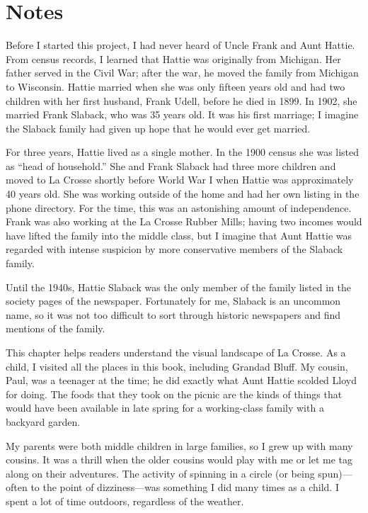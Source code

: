 \documentclass[
  letterpaper,
]{book}
\begin{document}
\section{Notes}\label{notes-4}

Before I started this project, I had never heard of Uncle Frank and Aunt
Hattie. From census records, I learned that Hattie was originally from
Michigan. Her father served in the Civil War; after the war, he moved
the family from Michigan to Wisconsin. Hattie married when she was only
fifteen years old and had two children with her first husband, Frank
Udell, before he died in 1899. In 1902, she married Frank Slaback, who
was 35 years old. It was his first marriage; I imagine the Slaback
family had given up hope that he would ever get married.

For three years, Hattie lived as a single mother. In the 1900 census she
was listed as ``head of household.'' She and Frank Slaback had three
more children and moved to La Crosse shortly before World War I when
Hattie was approximately 40 years old. She was working outside of the
home and had her own listing in the phone directory. For the time, this
was an astonishing amount of independence. Frank was also working at the
La Crosse Rubber Mills; having two incomes would have lifted the family
into the middle class, but I imagine that Aunt Hattie was regarded with
intense suspicion by more conservative members of the Slaback family.

Until the 1940s, Hattie Slaback was the only member of the family listed
in the society pages of the newspaper. Fortunately for me, Slaback is an
uncommon name, so it was not too difficult to sort through historic
newspapers and find mentions of the family.

This chapter helps readers understand the visual landscape of La Crosse.
As a child, I visited all the places in this book, including Grandad
Bluff. My cousin, Paul, was a teenager at the time; he did exactly what
Aunt Hattie scolded Lloyd for doing. The foods that they took on the
picnic are the kinds of things that would have been available in late
spring for a working-class family with a backyard garden.

My parents were both middle children in large families, so I grew up
with many cousins. It was a thrill when the older cousins would play
with me or let me tag along on their adventures. The activity of
spinning in a circle (or being spun)---often to the point of
dizziness---was something I did many times as a child. I spent a lot of
time outdoors, regardless of the weather.
\end{document}
